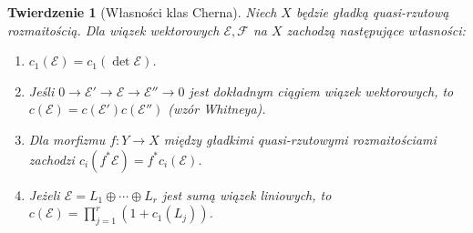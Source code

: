 \documentclass[11pt,a4paper,openany]{report}
\numberwithin{equation}{section}
\theoremstyle{plain}
\newtheorem{twierdzenie}{Twierdzenie}[section]
\theoremstyle{definition}
\theoremstyle{remark}
\begin{document}
\begin{twierdzenie}[Własności klas Cherna]
\label{tw:ga7-chern-axioms}
Niech $X$ będzie gładką quasi-rzutową rozmaitością.
Dla wiązek wektorowych $\mathcal E,\mathcal F$ na $X$
zachodzą następujące własności:
\begin{enumerate}[label=(\roman*)]
\item $c_1(\mathcal E)=c_1(\det\mathcal E)$.
\item Jeśli $0\to\mathcal E'\to\mathcal E\to\mathcal E''\to0$
      jest dokładnym ciągiem wiązek wektorowych, to
      $c(\mathcal E)=c(\mathcal E')c(\mathcal E'')$
      (\emph{wzór Whitneya}).
\item Dla morfizmu $f:Y\to X$ między gładkimi
      quasi-rzutowymi rozmaitościami zachodzi
      $c_i(f^*\mathcal E)=f^*c_i(\mathcal E)$.
\item Jeżeli $\mathcal E=L_1\oplus\cdots\oplus L_r$
      jest sumą wiązek liniowych, to
      $c(\mathcal E)=\prod_{j=1}^r(1+c_1(L_j))$.
\end{enumerate}
\end{twierdzenie}
\end{document}
